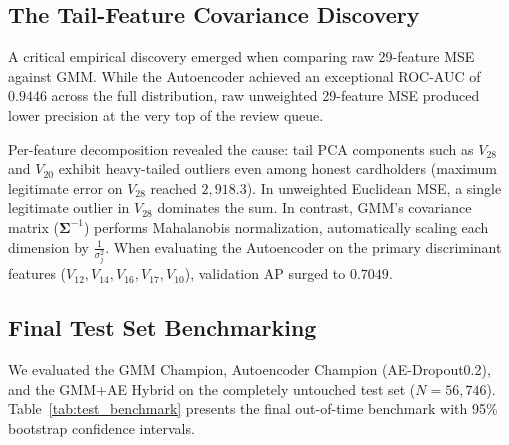 \documentclass[10pt,journal,compsoc]{IEEEtran}
\begin{document}
\subsection{The Tail-Feature Covariance Discovery}
A critical empirical discovery emerged when comparing raw 29-feature MSE against GMM. While the Autoencoder achieved an exceptional ROC-AUC of $0.9446$ across the full distribution, raw unweighted 29-feature MSE produced lower precision at the very top of the review queue. 

Per-feature decomposition revealed the cause: tail PCA components such as $V_{28}$ and $V_{20}$ exhibit heavy-tailed outliers even among honest cardholders (maximum legitimate error on $V_{28}$ reached $2,918.3$). In unweighted Euclidean MSE, a single legitimate outlier in $V_{28}$ dominates the sum. In contrast, GMM's covariance matrix ($\boldsymbol{\Sigma}^{-1}$) performs Mahalanobis normalization, automatically scaling each dimension by $\frac{1}{\sigma_j^2}$. When evaluating the Autoencoder on the primary discriminant features ($V_{12}, V_{14}, V_{16}, V_{17}, V_{10}$), validation AP surged to $0.7049$.

\subsection{Final Test Set Benchmarking}
We evaluated the GMM Champion, Autoencoder Champion (AE-Dropout0.2), and the GMM+AE Hybrid on the completely untouched test set ($N=56,746$). Table~\ref{tab:test_benchmark} presents the final out-of-time benchmark with 95\% bootstrap confidence intervals.
\end{document}

